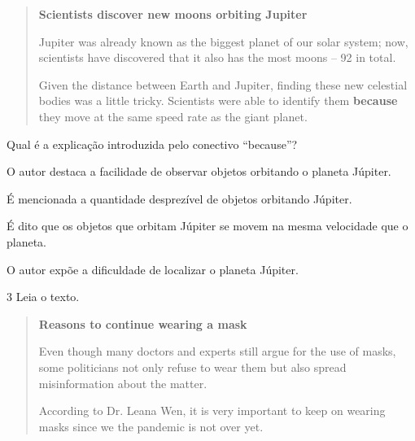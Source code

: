 \begin{quote}
\textbf{Scientists discover new moons orbiting Jupiter}

Jupiter was already known as the biggest planet of our solar system; now, scientists have discovered that it also has the most moons – 92 in total.

Given the distance between Earth and Jupiter, finding these new celestial bodies was a little tricky. Scientists were able to identify them \textbf{because} they move at the same speed rate as the giant planet.

\end{quote}

Qual é a explicação introduzida pelo conectivo ``because''?

\begin{escolha}
\item O autor destaca a facilidade de observar objetos orbitando o planeta
Júpiter.

\item É mencionada a quantidade desprezível de objetos orbitando Júpiter.

\item É dito que os objetos que orbitam Júpiter se movem na mesma
velocidade que o planeta.

\item O autor expõe a dificuldade de localizar o planeta Júpiter.
\end{escolha}


\num{3} Leia o texto.


\begin{quote}
\textbf{Reasons to continue wearing a mask}

Even though many doctors and experts still argue for the use of masks, some politicians not only refuse to wear them but also spread misinformation about the matter.

According to Dr. Leana Wen, it is very important to keep on wearing masks since we the pandemic is not over yet. 

\end{quote}

